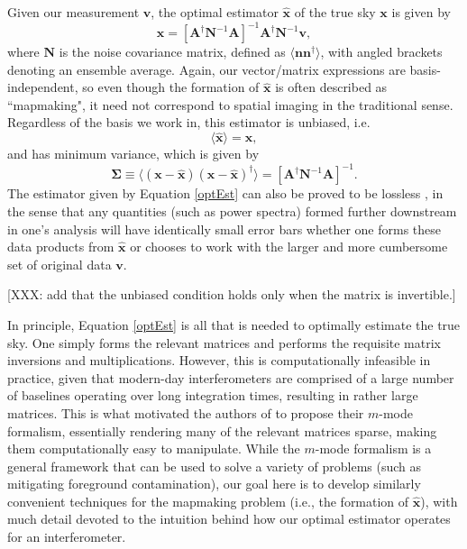 \documentclass[twocolumn,apj,numberedappendix]{emulateapj}
\newcommand{\vis}{\mathbf{v}}
\newcommand{\x}{\mathbf{x}}
\newcommand{\xhat}{\hat{\mathbf{x}}}
\newcommand{\A}{\mathbf{A}}
\newcommand{\N}{\mathbf{N}}
\begin{document}
Given our measurement $\vis$, the optimal estimator $\xhat$ of the true sky
$\x$ is given by \citep{Tegmark97,Morales2009}
\begin{equation}
\label{optEst}
\xhat = \left[ \A^\dagger \N^{-1} \A \right]^{-1} \A^\dagger \N^{-1} \vis,
\end{equation}
where $\N$ is the noise covariance matrix, defined as $\langle \mathbf{n}
\mathbf{n}^\dagger \rangle$, with angled brackets denoting an ensemble average.
Again, our vector/matrix expressions are basis-independent, so even though the
formation of $\xhat$ is often described as ``mapmaking", it need not correspond
to spatial imaging in the traditional sense.  Regardless of the basis we work
in, this estimator is unbiased, i.e.
\begin{equation}
\label{unbiased}
\langle \xhat \rangle = \x,
\end{equation}
and has minimum variance, which is given by
\begin{equation}
\label{eq:sigma}
\boldsymbol \Sigma \equiv \langle (\x - \xhat) ( \x - \xhat)^\dagger \rangle = \left[ \A^\dagger \N^{-1} \A \right]^{-1}.
\end{equation}
The estimator given by Equation \eqref{optEst} can also be proved to be
lossless \citep{Tegmark97}, in the sense that any quantities (such as power
spectra) formed further downstream in one's analysis will have identically
small error bars whether one forms these data products from $\xhat$ or chooses
to work with the larger and more cumbersome set of original data $\vis$.

[XXX: add that the unbiased condition holds only when the matrix is invertible.]

In principle, Equation \eqref{optEst} is all that is needed to optimally
estimate the true sky.  One simply forms the relevant matrices and performs the
requisite matrix inversions and multiplications.  However, this is
computationally infeasible in practice, given that modern-day interferometers
are comprised of a large number of baselines operating over long integration
times, resulting in rather large matrices.  This is what motivated the authors
of \cite{Shaw2013} to propose their $m$-mode formalism, essentially rendering
many of the relevant matrices sparse, making them computationally easy to
manipulate.  While the $m$-mode formalism is a general framework that can be
used to solve a variety of problems (such as mitigating foreground
contamination), our goal here is to develop similarly convenient techniques for
the mapmaking problem (i.e., the formation of $\xhat$), with much detail
devoted to the intuition behind how our optimal estimator operates for an
interferometer.
\end{document}
